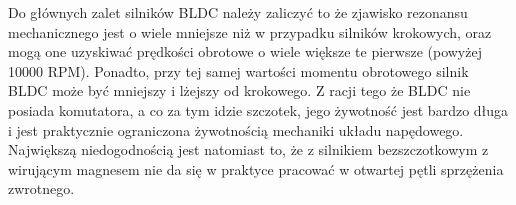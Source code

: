 Do głównych zalet silników BLDC należy zaliczyć to że zjawisko rezonansu mechanicznego jest o wiele mniejsze niż w przypadku silników krokowych, oraz mogą one uzyskiwać prędkości obrotowe o wiele większe te pierwsze (powyżej 10000 RPM). Ponadto, przy tej samej wartości momentu obrotowego silnik BLDC może być mniejszy i lżejszy od krokowego. Z racji tego że BLDC nie posiada komutatora, a co za tym idzie szczotek, jego żywotność jest bardzo długa i jest praktycznie ograniczona żywotnością mechaniki układu napędowego. Największą niedogodnością jest natomiast to, że z silnikiem bezszczotkowym z wirującym magnesem nie da się w praktyce pracować w otwartej pętli sprzężenia zwrotnego.

\clearpage

